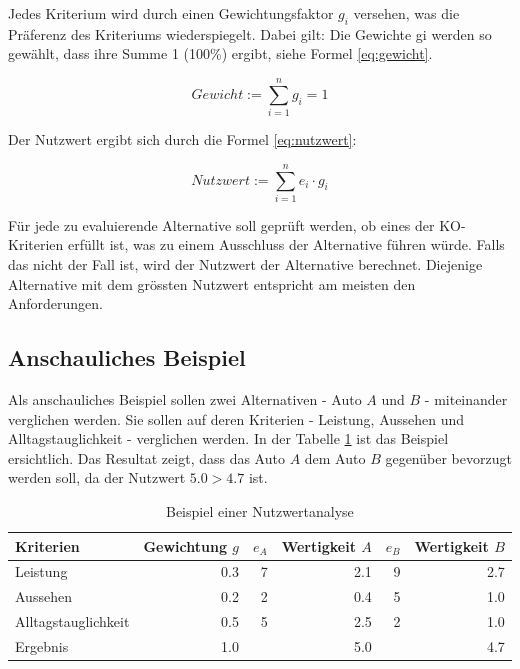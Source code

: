   Jedes Kriterium wird durch einen Gewichtungsfaktor \(g_i\) versehen, was
  die Präferenz des Kriteriums wiederspiegelt. Dabei gilt: Die Gewichte gi
  werden so gewählt, dass ihre Summe 1 (100\%) ergibt, siehe Formel \ref{eq:gewicht}.

  \begin{equation}
    \label{eq:gewicht}
    Gewicht := \sum \limits_{i=1}^n g_i = 1
  \end{equation}

  \newpage

  Der Nutzwert ergibt sich durch die Formel \ref{eq:nutzwert}:

  \begin{equation}
    \label{eq:nutzwert}
    Nutzwert := \sum \limits_{i=1}^n e_i \cdot g_i
  \end{equation}
  
  Für jede zu evaluierende Alternative soll geprüft werden, ob eines der
  KO-Kriterien erfüllt ist, was zu einem Ausschluss der Alternative führen
  würde. Falls das nicht der Fall ist, wird der Nutzwert der Alternative
  berechnet. Diejenige Alternative mit dem grössten Nutzwert entspricht am
  meisten den Anforderungen.
  
  \subsection{Anschauliches Beispiel}
  
  Als anschauliches Beispiel sollen zwei Alternativen - Auto \(A\) und \(B\) -
  miteinander verglichen werden. Sie sollen auf deren Kriterien - Leistung,
  Aussehen und Alltagstauglichkeit - verglichen werden. In der Tabelle
  \ref{tab:beispielNwa} ist das Beispiel ersichtlich. Das Resultat zeigt, dass
  das Auto \(A\) dem Auto \(B\) gegenüber bevorzugt werden soll, da der
  Nutzwert \(5.0 > 4.7\) ist. 
  
  \begin{table}[ht]
    \sffamily 
    \begin{center}
      \begin{tabular}{lrrrrr}
        \toprule
        Kriterien & Gewichtung \(g\) & \(e_A\) & Wertigkeit \(A\) & \(e_B\)
        & Wertigkeit \(B\)\\
        \midrule
        Leistung            & 0.3 & 7 & 2.1 & 9 & 2.7 \\
        Aussehen            & 0.2 & 2 & 0.4 & 5 & 1.0 \\
        Alltagstauglichkeit & 0.5 & 5 & 2.5 & 2 & 1.0 \\
        \midrule
        \midrule
        Ergebnis            & 1.0 &   & 5.0 &   & 4.7 \\
        \bottomrule
      \end{tabular}
      \caption{Beispiel einer Nutzwertanalyse}
      \label{tab:beispielNwa}
    \end{center}
  \end{table}
 
